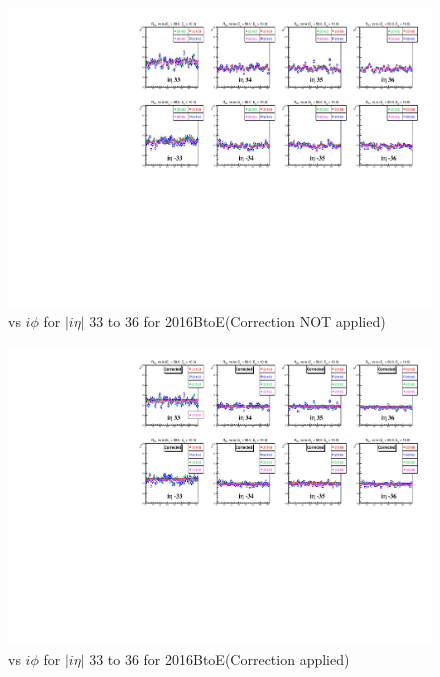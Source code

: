 \newpage
\begin{figure}[h!]
\centering
\includegraphics[width=0.99\linewidth]{../Figures/Chap2/ImageFiles_HF/Ratio/2016/Corrected/2016BtoE/ieta33_36_E1E2Cut3Ietaiphi}
\caption{\ratiosl vs $i\phi$ for $|i\eta|$ 33 to 36 for 2016BtoE(Correction NOT applied)}
\label{fig:ieta33_36_E1E2Cut3IetaiphiBtoE}
\end{figure}
\begin{figure}[h!]
\centering
\includegraphics[width=0.99\linewidth]{../Figures/Chap2/ImageFiles_HF/Ratio/2016/Corrected/2016BtoE/ieta33_36_E1E2Cut3Ietaiphi_Crrtd}
\caption{\ratiosl vs $i\phi$ for $|i\eta|$ 33 to 36 for 2016BtoE(Correction applied)}
\label{fig:ieta33_36_E1E2Cut3Ietaiphi_CrrtdBtoE}
\end{figure}
\newpage
